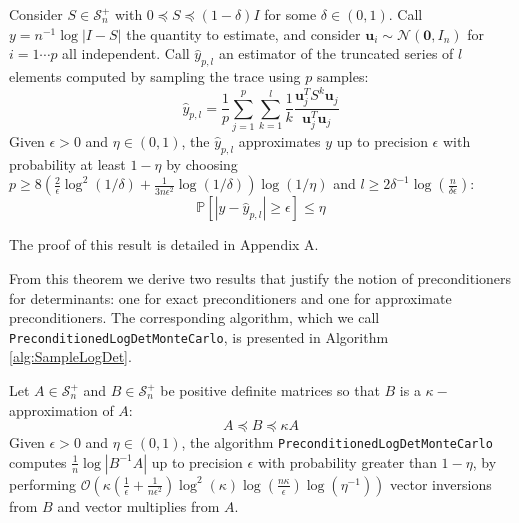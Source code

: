 \begin{theorem} \label{thm:det-sampling-theorem}Consider $S\in\mathcal{S}_{n}^{+}$
with $0\preceq S\preceq\left(1-\delta\right)I$ for some $\delta\in\left(0,1\right)$.
Call $y=n^{-1}\log\left|I-S\right|$ the quantity to estimate, and
consider $\mathbf{u}_{i}\sim\mathcal{N}\left(\mathbf{0},I_{n}\right)$
for $i=1\cdots p$ all independent. Call $\hat{y}_{p,l}$ an estimator
of the truncated series of $l$ elements computed by sampling the
trace using $p$ samples: 
\[
\hat{y}_{p,l}=\frac{1}{p}\sum_{j=1}^{p}\sum_{k=1}^{l}\frac{1}{k}\frac{\mathbf{u}_{j}^{T}S^{k}\mathbf{u}_{j}}{\mathbf{u}_{j}^{T}\mathbf{u}_{j}}
\]
Given $\epsilon>0$ and $\eta\in\left(0,1\right)$, the $\hat{y}_{p,l}$
approximates $y$ up to precision $\epsilon$ with probability at
least $1-\eta$ by choosing $p\geq 8\left(\frac{2}{\epsilon}\log^{2}\left(1/\delta\right)+\frac{1}{3n\epsilon^{2}}\log\left(1/\delta\right)\right)\log\left(1/\eta\right)$
and $l\geq2\delta^{-1}\log\left(\frac{n}{\delta\epsilon}\right)$:
\[
\mathbb{P}\left[\left|y-\hat{y}_{p,l}\right|\geq\epsilon\right]\leq\eta
\]
\end{theorem}

The proof of this result is detailed in Appendix A.

From this theorem we derive two results that justify the notion of
preconditioners for determinants: one for exact preconditioners and
one for approximate preconditioners. The corresponding algorithm,
which we call \texttt{PreconditionedLogDetMonteCarlo}, is presented
in Algorithm \ref{alg:SampleLogDet}.

\begin{corollary} \label{cor:preconditioning}Let $A\in\mathcal{S}_{n}^{+}$
and $B\in\mathcal{S}_{n}^{+}$ be positive definite matrices so that
$B$ is a $\kappa-$approximation of $A$: 
\begin{equation}
A\preceq B\preceq\kappa A\label{eq:A-B-bounds}
\end{equation}
Given $\epsilon>0$ and $\eta\in\left(0,1\right)$, the algorithm
\texttt{PreconditionedLogDetMonteCarlo} computes $\frac{1}{n}\log\left|B^{-1}A\right|$
up to precision $\epsilon$ with probability greater than $1-\eta$,
by performing $\mathcal{O}\left(\kappa\left(\frac{1}{\epsilon}+\frac{1}{n\epsilon^{2}}\right)\log^{2}\left(\kappa\right)\log\left(\frac{n\kappa}{\epsilon}\right)\log\left(\eta^{-1}\right)\right)$
vector inversions from $B$ and vector multiplies from $A$.

\end{corollary}

